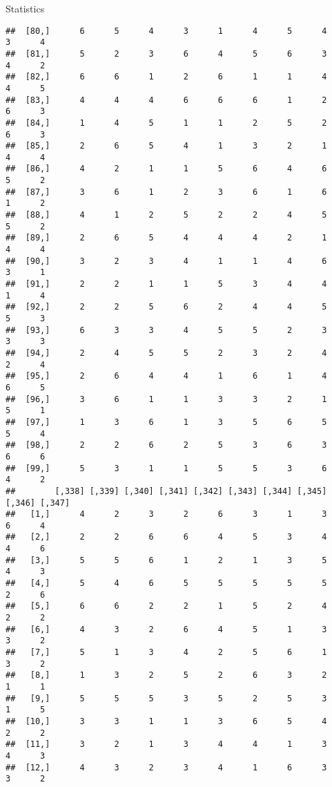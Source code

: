 \documentclass[
  ignorenonframetext,
]{beamer}
\begin{document}
\begin{frame}[fragile]{Statistics}
\begin{verbatim}
##  [80,]      6      5      4      3      1      4      5      4      3      4
##  [81,]      5      2      3      6      4      5      6      3      4      2
##  [82,]      6      6      1      2      6      1      1      4      4      5
##  [83,]      4      4      4      6      6      6      1      2      6      3
##  [84,]      1      4      5      1      1      2      5      2      6      3
##  [85,]      2      6      5      4      1      3      2      1      4      4
##  [86,]      4      2      1      1      5      6      4      6      5      2
##  [87,]      3      6      1      2      3      6      1      6      1      2
##  [88,]      4      1      2      5      2      2      4      5      5      2
##  [89,]      2      6      5      4      4      4      2      1      4      4
##  [90,]      3      2      3      4      1      1      4      6      3      1
##  [91,]      2      2      1      1      5      3      4      4      1      4
##  [92,]      2      2      5      6      2      4      4      5      5      3
##  [93,]      6      3      3      4      5      5      2      3      3      3
##  [94,]      2      4      5      5      2      3      2      4      2      4
##  [95,]      2      6      4      4      1      6      1      4      6      5
##  [96,]      3      6      1      1      3      3      2      1      5      1
##  [97,]      1      3      6      1      3      5      6      5      5      4
##  [98,]      2      2      6      2      5      3      6      3      6      6
##  [99,]      5      3      1      1      5      5      3      6      4      2
##        [,338] [,339] [,340] [,341] [,342] [,343] [,344] [,345] [,346] [,347]
##   [1,]      4      2      3      2      6      3      1      3      6      4
##   [2,]      2      2      6      6      4      5      3      4      4      6
##   [3,]      5      5      6      1      2      1      3      5      4      3
##   [4,]      5      4      6      5      5      5      5      5      2      6
##   [5,]      6      6      2      2      1      5      2      4      2      2
##   [6,]      4      3      2      6      4      5      1      3      3      2
##   [7,]      5      1      3      4      2      5      6      1      3      2
##   [8,]      1      3      2      5      2      6      3      2      1      1
##   [9,]      5      5      5      3      5      2      5      3      1      5
##  [10,]      3      3      1      1      3      6      5      4      2      2
##  [11,]      3      2      1      3      4      4      1      3      4      3
##  [12,]      4      3      2      3      4      1      6      3      3      2

\end{verbatim}
\end{frame}
\end{document}

